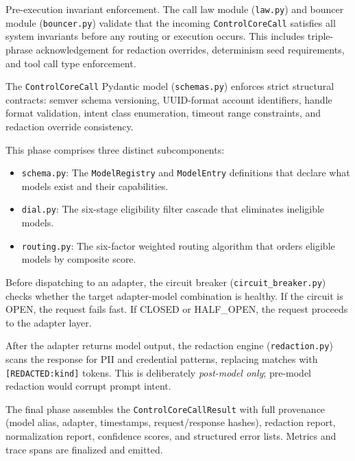 \documentclass[11pt,a4paper]{article}
\theoremstyle{plain}
\theoremstyle{definition}
\begin{document}
\begin{description}[leftmargin=2em]
\item[P0 --- Call Law \& Bouncer] Pre-execution invariant enforcement. The call
  law module (\texttt{law.py}) and bouncer module (\texttt{bouncer.py}) validate
  that the incoming \texttt{ControlCoreCall} satisfies all system invariants
  before any routing or execution occurs. This includes triple-phrase
  acknowledgement for redaction overrides, determinism seed requirements, and
  tool call type enforcement.

\item[P1 --- Schema Validation] The \texttt{ControlCoreCall} Pydantic model
  (\texttt{schemas.py}) enforces strict structural contracts: semver schema
  versioning, UUID-format account identifiers, handle format validation, intent
  class enumeration, timeout range constraints, and redaction override
  consistency.

\item[P2 --- Registry, Dial, \& Routing] This phase comprises three distinct
  subcomponents:
  \begin{itemize}
    \item \texttt{schema.py}: The \texttt{ModelRegistry} and
      \texttt{ModelEntry} definitions that declare what models exist and their
      capabilities.
    \item \texttt{dial.py}: The six-stage eligibility filter cascade that
      eliminates ineligible models.
    \item \texttt{routing.py}: The six-factor weighted routing algorithm that
      orders eligible models by composite score.
  \end{itemize}

\item[P3 --- Circuit Breaker \& Adapter Execution] Before dispatching to an
  adapter, the circuit breaker (\texttt{circuit\_breaker.py}) checks whether the
  target adapter-model combination is healthy. If the circuit is OPEN, the
  request fails fast. If CLOSED or HALF\_OPEN, the request proceeds to the
  adapter layer.

\item[P4 --- Post-Model Redaction] After the adapter returns model output, the
  redaction engine (\texttt{redaction.py}) scans the response for PII and
  credential patterns, replacing matches with \texttt{[REDACTED:kind]} tokens.
  This is deliberately \emph{post-model only}; pre-model redaction would corrupt
  prompt intent.

\item[P5 --- Result Assembly \& Observability] The final phase assembles the
  \texttt{ControlCoreCallResult} with full provenance (model alias, adapter,
  timestamps, request/response hashes), redaction report, normalization report,
  confidence scores, and structured error lists. Metrics and trace spans are
  finalized and emitted.
\end{description}
\end{document}
